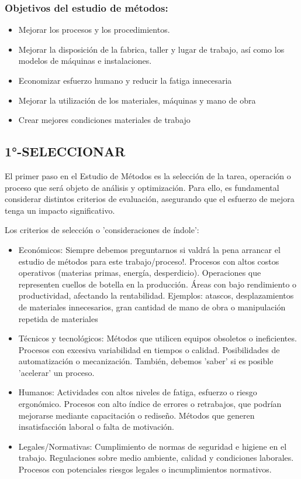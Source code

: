 \documentclass[a4paper,oneside,11pt]{article}
\begin{document}
\subsubsection{Objetivos del estudio de métodos:}

\begin{itemize}
    \item Mejorar los procesos y los procedimientos.
    \item Mejorar la disposición de la fabrica, taller y lugar de trabajo, así como los modelos de máquinas e instalaciones.
    \item Economizar esfuerzo humano y reducir la fatiga innecesaria
    \item Mejorar la utilización de los materiales, máquinas y mano de obra
    \item Crear mejores condiciones materiales de trabajo
\end{itemize}

\subsection{1°-SELECCIONAR}

El primer paso en el Estudio de Métodos es la selección de la tarea, operación o proceso que será objeto de análisis y optimización. Para ello, es fundamental considerar distintos criterios de evaluación, asegurando que el esfuerzo de mejora tenga un impacto significativo.

Los criterios de selección o 'consideraciones de índole':

\begin{itemize}
    \item Económicos: Siempre debemos preguntarnos si valdrá la pena arrancar el estudio de métodos para este trabajo/proceso!. Procesos con altos costos operativos (materias primas, energía, desperdicio). Operaciones que representen cuellos de botella en la producción. Áreas con bajo rendimiento o productividad, afectando la rentabilidad. Ejemplos: atascos, desplazamientos de materiales innecesarios, gran cantidad de mano de obra o manipulación repetida de materiales

    \item Técnicos y tecnológicos: Métodos que utilicen equipos obsoletos o ineficientes. Procesos con excesiva variabilidad en tiempos o calidad. Posibilidades de automatización o mecanización. También, debemos 'saber' si es posible 'acelerar' un proceso.

    \item Humanos: Actividades con altos niveles de fatiga, esfuerzo o riesgo ergonómico. Procesos con alto índice de errores o retrabajos, que podrían mejorarse mediante capacitación o rediseño. Métodos que generen insatisfacción laboral o falta de motivación.

    \item Legales/Normativas: Cumplimiento de normas de seguridad e higiene en el trabajo. Regulaciones sobre medio ambiente, calidad y condiciones laborales. Procesos con potenciales riesgos legales o incumplimientos normativos.
\end{itemize}
\end{document}
